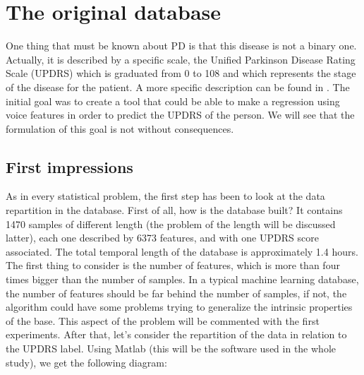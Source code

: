 \documentclass{report}
\begin{document}
	\chapter{The original database}
	
	One thing that must be known about PD is that this disease is not a binary one. Actually, it is described by a specific scale, the Unified Parkinson Disease Rating Scale (UPDRS) which is graduated from 0 to 108 and which represents the stage of the disease for the patient. A more specific description can be found in \cite{movement2003unified}. The initial goal was to create a tool that could be able to make a regression using voice features in order to predict the UPDRS of the person. We will see that the formulation of this goal is not without consequences.
	
		\section{First impressions}
		
		As in every statistical problem, the first step has been to look at the data repartition in the database. First of all, how is the database built? It contains 1470 samples of different length (the problem of the length will be discussed latter), each one described by 6373 features, and with one UPDRS score associated. The total temporal length of the database is approximately 1.4 hours. The first thing to consider is the number of features, which is more than four times bigger than the number of samples. In a typical machine learning database, the number of features should be far behind the number of samples, if not, the algorithm could have some problems trying to generalize the intrinsic properties of the base. This aspect of the problem will be commented with the first experiments.
		After that, let's consider the repartition of the data in relation to the UPDRS label. Using Matlab (this will be the software used in the whole study), we get the following diagram:
		
\end{document}
